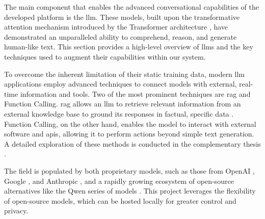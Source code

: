 The main component that enables the advanced conversational capabilities of the developed platform is the \acl{llm}. These models, built upon the transformative attention mechanism introduced by the Transformer architecture \cite{SOTA-TRANSFORMERS}, have demonstrated an unparalleled ability to comprehend, reason, and generate human-like text. This section provides a high-level overview of \acp{llm} and the key techniques used to augment their capabilities within our system.

To overcome the inherent limitation of their static training data, modern \ac{llm} applications employ advanced techniques to connect models with external, real-time information and tools. Two of the most prominent techniques are \ac{rag} and Function Calling. \ac{rag} allows an \ac{llm} to retrieve relevant information from an external knowledge base to ground its responses in factual, specific data \cite{SOTA-RAG-SURVEY}. Function Calling, on the other hand, enables the model to interact with external software and \acp{api}, allowing it to perform actions beyond simple text generation. A detailed exploration of these methods is conducted in the complementary thesis \cite{MUI2ICSI:SOTA}.

The field is populated by both proprietary models, such as those from OpenAI \cite{CHATGPT}, Google \cite{GEMINI}, and Anthropic \cite{CLAUDE}, and a rapidly growing ecosystem of open-source alternatives like the Qwen series of models \cite{QWEN}. This project leverages the flexibility of open-source models, which can be hosted locally for greater control and privacy.
